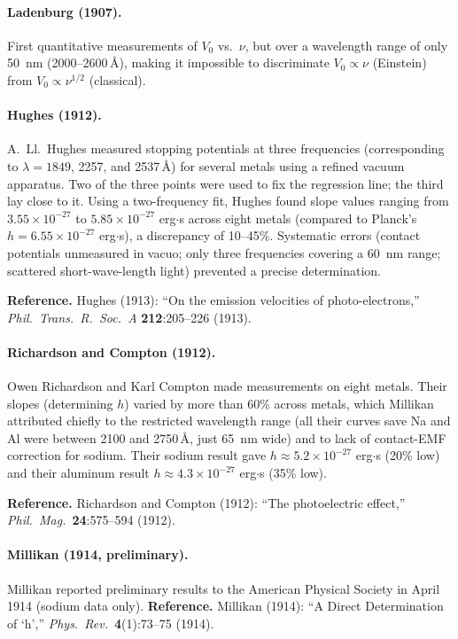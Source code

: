 \documentclass[12pt]{article}
\begin{document}
\paragraph{Ladenburg (1907).}  First quantitative measurements of $V_0$
vs.\ $\nu$, but over a wavelength range of only 50~nm (2000--2600\,\AA),
making it impossible to discriminate $V_0 \propto \nu$ (Einstein) from
$V_0 \propto \nu^{1/2}$ (classical).

\paragraph{Hughes (1912).}  A.\ Ll.\ Hughes measured stopping potentials at
three frequencies (corresponding to $\lambda = 1849$, 2257, and 2537\,\AA)
for several metals using a refined vacuum apparatus.  Two of the three points
were used to fix the regression line; the third lay close to it.  Using a
two-frequency fit, Hughes found slope values ranging from $3.55\times10^{-27}$
to $5.85\times10^{-27}$ erg$\cdot$s across eight metals (compared to
Planck's $h = 6.55\times10^{-27}$ erg$\cdot$s), a discrepancy of 10--45\%.
Systematic errors (contact potentials unmeasured in vacuo; only three
frequencies covering a 60~nm range; scattered short-wave-length light)
prevented a precise determination.

\textbf{Reference.}  Hughes (1913): ``On the emission velocities of
photo-electrons,'' \emph{Phil.\ Trans.\ R.\ Soc.\ A}
\textbf{212}:205--226 (1913). 

\paragraph{Richardson and Compton (1912).}  Owen Richardson and Karl Compton
made measurements on eight metals.  Their slopes (determining $h$) varied by
more than 60\% across metals, which Millikan attributed chiefly to the
restricted wavelength range (all their curves save Na and Al were between
2100 and 2750\,\AA, just 65~nm wide) and to lack of contact-EMF correction
for sodium.  Their sodium result gave $h \approx 5.2\times10^{-27}$ erg$\cdot$s
(20\% low) and their aluminum result $h \approx 4.3\times10^{-27}$ erg$\cdot$s
(35\% low).

\textbf{Reference.}  Richardson and Compton (1912): ``The photoelectric
effect,'' \emph{Phil.\ Mag.}\ \textbf{24}:575--594 (1912).

\paragraph{Millikan (1914, preliminary).}  Millikan reported preliminary
results to the American Physical Society in April 1914 (sodium data only).
\textbf{Reference.}  Millikan (1914): ``A Direct Determination of `h',''
\emph{Phys.\ Rev.}\ \textbf{4}(1):73--75 (1914).
\end{document}
